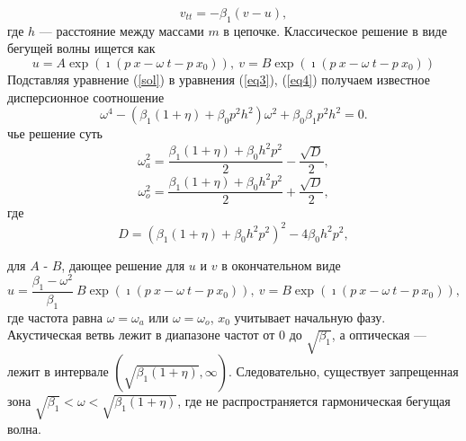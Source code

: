 \begin{equation}
v_{tt}=-\beta_1 (v-u), \label{eq4}
\end{equation}
где $ h $ --- расстояние между массами $ m $ в цепочке.
Классическое решение в виде бегущей волны ищется как
\begin{equation}\label{sol}
 u=A\exp (\imath(p~ x - \omega~ t- p~ x_0)), ~
   v=B \exp (\imath(p~ x - \omega~ t-p~ x_0))
\end{equation}
Подставляя уравнение (\ref{sol}) в уравнения (\ref{eq3}), (\ref{eq4}) получаем известное дисперсионное соотношение \cite{Huang2010}
\[
\omega^4 -(\beta_1(1+\eta)+\beta_0 p^2 h^2)\omega^2+\beta_0 \beta_1 p^2 h^2=0.
\]
чье решение суть 
\begin{equation}\label{acdiscr}
\omega_a^2=\frac{\beta_1(1+\eta)+\beta_0 h^2 p^2}{2}-\frac{\sqrt{D}}{2},
\end{equation}
\begin{equation}\label{optdiscr}
\omega_o^2=\frac{\beta_1(1+\eta)+\beta_0 h^2 p^2}{2}+\frac{\sqrt{D}}{2},
\end{equation}
где
\[
D=(\beta_1(1+\eta)+\beta_0 h^2 p^2)^2-4\beta_0 h^2 p^2,
\]

 для $A$ - $B$, дающее решение для $u$ и $v$ в окончательном виде
\begin{equation}\label{solfin}
 u=\frac{\beta_1-\omega^2}{\beta_1}~B\exp (\imath(p~ x - \omega~ t- p~ x_0)), ~
   v=B \exp (\imath(p~ x - \omega~ t- p~ x_0)),
\end{equation}
где частота равна $ \omega = \omega_a $ или $ \omega = \omega_o $, $ x_0 $ учитывает начальную фазу.
Акустическая ветвь лежит в диапазоне частот от $ 0 $ до $ \sqrt {\beta_1} $, а оптическая --- лежит в интервале $(\sqrt{\beta_1(1+\eta)}, \infty)$. Следовательно, существует запрещенная зона $ \sqrt {\beta_1} <\omega <\sqrt {\beta_1 (1+ \eta)} $, где не распространяется гармоническая бегущая волна.

